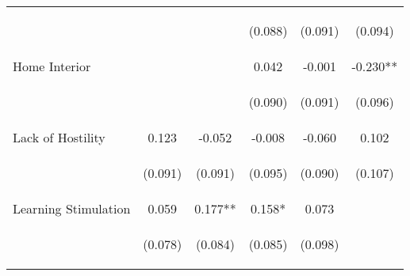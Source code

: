 \begin{tabular}{lccccc}
 & \begin{footnotesize}\end{footnotesize} & \begin{footnotesize}\end{footnotesize} & \begin{footnotesize}(0.088)\end{footnotesize} & \begin{footnotesize}(0.091)\end{footnotesize} & \begin{footnotesize}(0.094)\end{footnotesize}\\
\noalign{\smallskip}Home Interior &  &  & 0.042 & -0.001 & -0.230**\\
 & \begin{footnotesize}\end{footnotesize} & \begin{footnotesize}\end{footnotesize} & \begin{footnotesize}(0.090)\end{footnotesize} & \begin{footnotesize}(0.091)\end{footnotesize} & \begin{footnotesize}(0.096)\end{footnotesize}\\
\noalign{\smallskip}Lack of Hostility & 0.123 & -0.052 & -0.008 & -0.060 & 0.102\\
 & \begin{footnotesize}(0.091)\end{footnotesize} & \begin{footnotesize}(0.091)\end{footnotesize} & \begin{footnotesize}(0.095)\end{footnotesize} & \begin{footnotesize}(0.090)\end{footnotesize} & \begin{footnotesize}(0.107)\end{footnotesize}\\
\noalign{\smallskip}Learning Stimulation & 0.059 & 0.177** & 0.158* & 0.073 & \\
 & \begin{footnotesize}(0.078)\end{footnotesize} & \begin{footnotesize}(0.084)\end{footnotesize} & \begin{footnotesize}(0.085)\end{footnotesize} & \begin{footnotesize}(0.098)\end{footnotesize} & \begin{footnotesize}\end{footnotesize}\\

\end{tabular}
